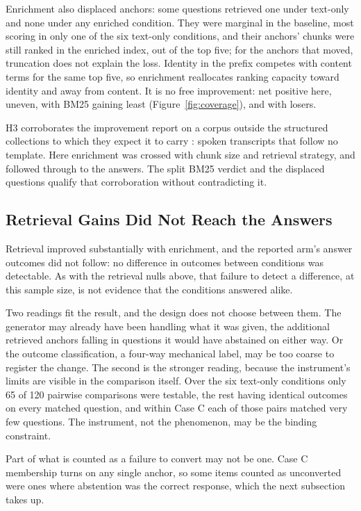 Enrichment also displaced anchors: some questions retrieved one under text-only and
none under any enriched condition. They were marginal in
the baseline, most scoring in only one of the six text-only conditions, and their
anchors' chunks were still ranked in the enriched index, out of the top five;
for the anchors that moved, truncation does not explain the loss.
Identity in the prefix competes with content terms for the same top five, so
enrichment reallocates ranking capacity toward identity and away from content.
It is no free improvement: net positive here, uneven, with BM25 gaining least
(Figure~\ref{fig:coverage}), and with losers.

H3 corroborates the improvement \textcite[9]{yousuf2026} report on a corpus
outside the structured collections to which they expect it to carry
\parencite[13]{yousuf2026}: spoken transcripts that follow no template. Here
enrichment was crossed with chunk size and retrieval strategy, and followed
through to the answers. The split BM25 verdict and the displaced questions
qualify that corroboration without contradicting it.

\subsection{Retrieval Gains Did Not Reach the Answers}

Retrieval improved substantially with enrichment, and the reported arm's answer
outcomes did not follow: no difference in outcomes between conditions was
detectable. As with the retrieval nulls above, that failure to detect a
difference, at this sample size, is not evidence that the conditions answered
alike.

Two readings fit the result, and the design does not choose between them. The
generator may already have been handling what it was given, the additional
retrieved anchors falling in questions it would have abstained on either way.
Or the outcome classification, a four-way mechanical label, may be too coarse
to register the change. The second is the stronger reading, because the
instrument's limits are visible in the comparison itself. Over the six text-only conditions
only 65 of 120 pairwise comparisons were testable, the rest having identical
outcomes on every matched question, and within Case C each of those pairs
matched very few questions. The instrument, not the phenomenon, may be the
binding constraint.

Part of what is counted as a failure to convert may not be one. Case C
membership turns on any single anchor, so some items counted as unconverted were
ones where abstention was the correct response, which the next subsection takes
up.

